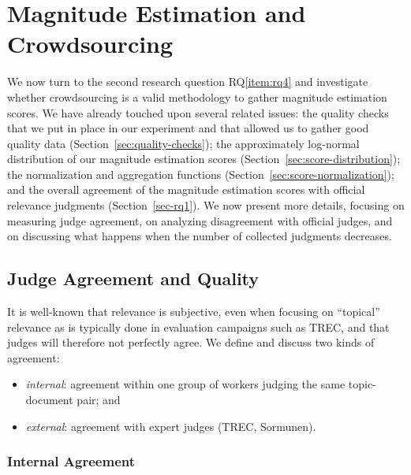 \section{Magnitude Estimation and Crowdsourcing}
\label{sec:cs}

We now turn to the second research question RQ\ref{item:rq4} and 
investigate whether crowdsourcing is a valid methodology to gather magnitude
estimation scores. 
We have already touched upon several related issues: the quality
checks that we put in place in our experiment and that allowed us to
gather good quality data (Section~\ref{sec:quality-checks}); the
approximately log-normal distribution of our magnitude estimation
scores (Section~\ref{sec:score-distribution}); the normalization and
aggregation functions (Section~\ref{sec:score-normalization}); and the
overall agreement of the magnitude estimation scores with official
relevance judgments (Section~\ref{sec-rq1}). 
We now present more details, focusing on measuring judge
agreement, on analyzing disagreement with official judges, and on
discussing what happens when the number of collected judgments 
decreases.

%

\subsection{Judge Agreement and Quality}
 \label{sec:judge-agreement}
It is well-known that relevance is subjective, even when focusing on
``topical'' relevance as is typically done in evaluation campaigns such
as TREC, and that judges will therefore not perfectly agree.
We define and discuss two kinds of agreement:
\begin{itemize}
\item \emph{internal}: agreement within one group of workers judging the
  same topic-document pair; and 
\item \emph{external}: agreement with expert judges (TREC,
  Sormunen). 
\end{itemize}
  
\subsubsection{Internal Agreement}
\label{sec:internal-agreement}

